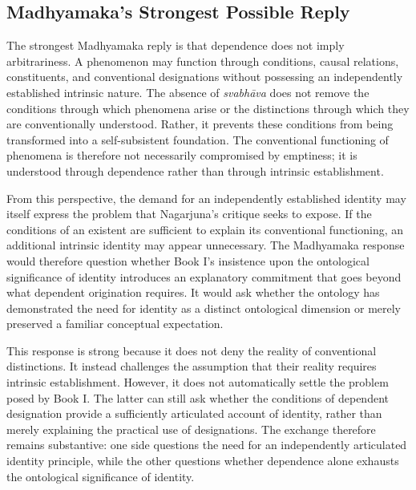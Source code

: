 \subsection{Madhyamaka's Strongest Possible Reply}
\label{subsec:ch08_s18_ss18}

\label{para:VS.B01.P01.C08.S18.SS18.P001}
The strongest Madhyamaka reply is that dependence does not imply arbitrariness. A phenomenon may function through conditions, causal relations, constituents, and conventional designations without possessing an independently established intrinsic nature. The absence of \emph{svabh\={a}va} does not remove the conditions through which phenomena arise or the distinctions through which they are conventionally understood. Rather, it prevents these conditions from being transformed into a self-subsistent foundation. The conventional functioning of phenomena is therefore not necessarily compromised by emptiness; it is understood through dependence rather than through intrinsic establishment.

\label{para:VS.B01.P01.C08.S18.SS18.P002}
From this perspective, the demand for an independently established identity may itself express the problem that Nagarjuna's critique seeks to expose. If the conditions of an existent are sufficient to explain its conventional functioning, an additional intrinsic identity may appear unnecessary. The Madhyamaka response would therefore question whether Book I's insistence upon the ontological significance of identity introduces an explanatory commitment that goes beyond what dependent origination requires. It would ask whether the ontology has demonstrated the need for identity as a distinct ontological dimension or merely preserved a familiar conceptual expectation.

\label{para:VS.B01.P01.C08.S18.SS18.P003}
This response is strong because it does not deny the reality of conventional distinctions. It instead challenges the assumption that their reality requires intrinsic establishment. However, it does not automatically settle the problem posed by Book I. The latter can still ask whether the conditions of dependent designation provide a sufficiently articulated account of identity, rather than merely explaining the practical use of designations. The exchange therefore remains substantive: one side questions the need for an independently articulated identity principle, while the other questions whether dependence alone exhausts the ontological significance of identity.

